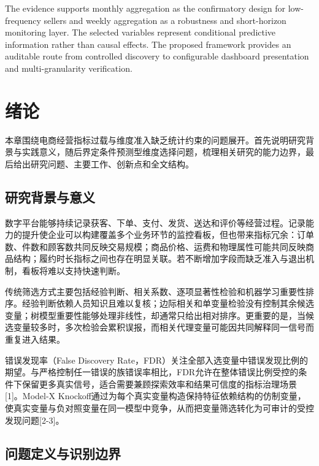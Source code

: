\documentclass{sufethesismas}
\begin{document}
\begin{abstractEN}
The evidence supports monthly aggregation as the confirmatory design for low-frequency sellers and weekly aggregation as a robustness and short-horizon monitoring layer. The selected variables represent conditional predictive information rather than causal effects. The proposed framework provides an auditable route from controlled discovery to configurable dashboard presentation and multi-granularity verification.
\end{abstractEN}

\tableofcontents

\mainmatter
\chapter{绪论}

本章围绕电商经营指标过载与维度准入缺乏统计约束的问题展开。首先说明研究背景与实践意义，随后界定条件预测型维度选择问题，梳理相关研究的能力边界，最后给出研究问题、主要工作、创新点和全文结构。

\section{研究背景与意义}

数字平台能够持续记录获客、下单、支付、发货、送达和评价等经营过程。记录能力的提升使企业可以构建覆盖多个业务环节的监控看板，但也带来指标冗余：订单数、件数和顾客数共同反映交易规模；商品价格、运费和物理属性可能共同反映商品结构；履约时长指标之间也存在明显关联。若不断增加字段而缺乏准入与退出机制，看板将难以支持快速判断。

传统筛选方式主要包括经验判断、相关系数、逐项显著性检验和机器学习重要性排序。经验判断依赖人员知识且难以复核；边际相关和单变量检验没有控制其余候选变量；树模型重要性能够处理非线性，却通常只给出相对排序。更重要的是，当候选变量较多时，多次检验会累积误报，而相关代理变量可能因共同解释同一信号而重复进入结果。

错误发现率（False Discovery Rate，FDR）关注全部入选变量中错误发现比例的期望。与严格控制任一错误的族错误率相比，FDR允许在整体错误比例受控的条件下保留更多真实信号，适合需要兼顾探索效率和结果可信度的指标治理场景{[}1{]}。Model-X Knockoff通过为每个真实变量构造保持特征依赖结构的仿制变量，使真实变量与负对照变量在同一模型中竞争，从而把变量筛选转化为可审计的受控发现问题{[}2-3{]}。

\section{问题定义与识别边界}
\end{document}
